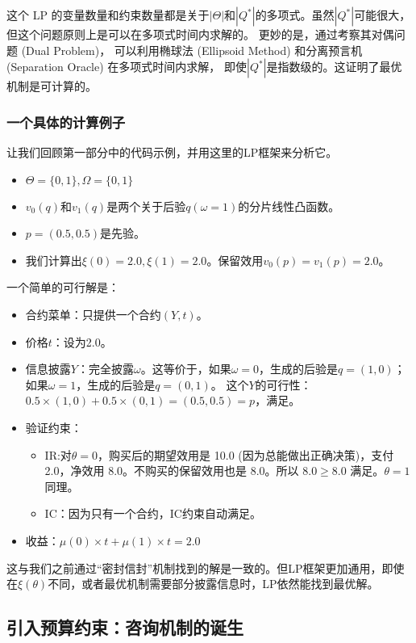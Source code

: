 这个 LP 的变量数量和约束数量都是关于$|\Theta|$和$|Q^\ast|$的多项式。虽然$|Q^\ast|$可能很大，
但这个问题原则上是可以在多项式时间内求解的。
更妙的是，通过考察其对偶问题 (Dual Problem)，
可以利用椭球法 (Ellipsoid Method) 和分离预言机 (Separation Oracle) 在多项式时间内求解，
即使$|Q^\ast|$是指数级的。这证明了最优机制是可计算的。

\subsubsection{一个具体的计算例子}

让我们回顾第一部分中的代码示例，并用这里的LP框架来分析它。

\begin{itemize}
    \item $\Theta=\{0,1\},\Omega=\{0,1\}$
    \item $v_0 (q)$和$v_1 (q)$是两个关于后验$q(\omega=1)$的分片线性凸函数。
    \item $p=(0.5,0.5)$是先验。
    \item 我们计算出$\xi(0)=2.0,\xi(1)=2.0$。保留效用$v_0(p)=v_1(p)=2.0$。
\end{itemize}

一个简单的可行解是：
\begin{itemize}
    \item 合约菜单：只提供一个合约$(Y,t)$。
    \item 价格$t$：设为2.0。
    \item 信息披露$Y$：完全披露$\omega$。这等价于，如果$\omega=0$，生成的后验是$q=(1,0)$；如果$\omega=1$，生成的后验是$q=(0,1)$。 这个$Y$的可行性：$0.5\times (1,0) + 0.5\times (0,1) = (0.5, 0.5)=p$，满足。
    \item 验证约束：
       \begin{itemize}
         \item IR:对$\theta=0$，购买后的期望效用是 10.0 (因为总能做出正确决策)，支付 2.0，净效用 8.0。不购买的保留效用也是 8.0。所以 8.0$\geq$8.0 满足。$\theta=1$同理。
         \item IC：因为只有一个合约，IC约束自动满足。
       \end{itemize}
    \item 收益：$\mu(0)\times t + \mu(1)\times t = 2.0$
\end{itemize}

这与我们之前通过“密封信封”机制找到的解是一致的。但LP框架更加通用，即使在$\xi(\theta)$不同，或者最优机制需要部分披露信息时，LP依然能找到最优解。

\subsection{引入预算约束：咨询机制的诞生}

